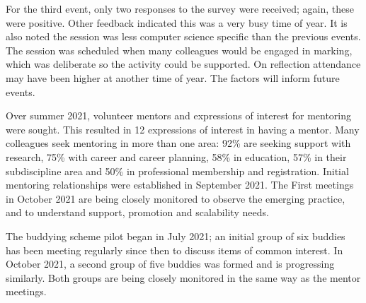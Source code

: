 \documentclass[sigconf]{acmart}
\begin{document}
For the third event, only two responses to the survey were
received; again, these were positive. Other feedback indicated this was a
very busy time of year. It is also noted the session was less computer
science specific than the previous events. The session was scheduled
when many colleagues would be engaged in marking, which was deliberate
so the activity could be supported. On reflection attendance may have
been higher at another time of year. The factors will inform future events.
\begin{comment}
TO DO - evaluation of Mentoring - PH what is needed here? Is sufficient to indicate the first pilot of 10 Mentees has been established? Or do we need feedback from the participants?
\end{comment}

Over summer 2021, volunteer mentors and expressions of interest for
mentoring were sought. This resulted in 12 expressions of interest in
having a mentor. Many colleagues seek mentoring in more than one area:
92\% are seeking support with research, 75\% with career and career
planning, 58\% in education, 57\% in their subdiscipline area and 50\%
in professional membership and registration. Initial mentoring
relationships were established in September 2021. The First meetings in October 2021 are being closely monitored to observe the emerging practice, and to understand support, promotion and scalability needs.

\begin{comment}
To DO - evaluation of Buddying - PH what is needed here? Is sufficient to indicate the first pilot of 10 buddies has been established? Or do we need feedback from the participants?
\end{comment}

The buddying scheme pilot began in July 2021; an initial group of six
buddies has been meeting regularly since then to discuss items of
common interest. In October 2021, a second group of five buddies was
formed and is progressing similarly. Both groups are being closely
monitored in the same way as the mentor meetings.
\end{document}
